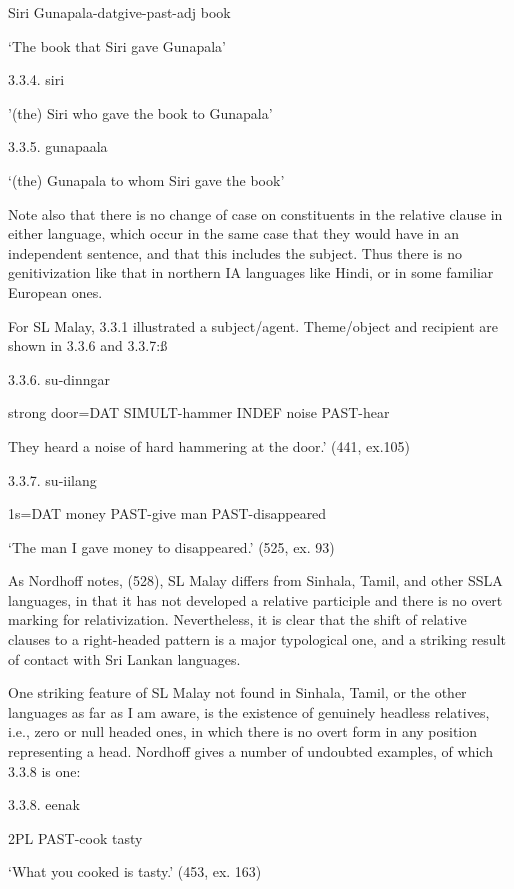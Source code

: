 \documentclass[letterpaper]{article}
\begin{document}
  Siri  Gunapala-datgive-past-adj  book 

   `The book that Siri  gave Gunapala'

3.3.4.
\ea
{}  siri

'(the) Siri who gave the book to Gunapala'

3.3.5. 
\ea
{}  gunapaala

   `(the) Gunapala to whom Siri gave the book'

Note also that there is no change of case on constituents in the relative clause in either language, which occur in the same case that they would have in an independent sentence, and that this includes the subject. Thus there is no genitivization like that in northern IA languages like Hindi, or in some familiar European ones.

For SL Malay, 3.3.1 illustrated a subject/agent. Theme/object and recipient are shown in 3.3.6 and 3.3.7:{\ss}

 3.3.6.
\ea
\gll  [Kirras  pinthu=nang  arà-thatti  hathu svaara] su-dinngar

strong door=DAT SIMULT-hammer INDEF noise PAST-hear

They heard a noise of hard hammering at the door.' (441, ex.105)

 3.3.7.
\ea
{} su-iilang

  1s=DAT money PAST-give  man PAST-disappeared

  `The man I gave money to disappeared.' (525, ex. 93)

As Nordhoff notes, (528), SL Malay differs from Sinhala, Tamil, and other SSLA languages, in that it has not developed a relative participle and there is no overt marking for relativization. Nevertheless, it is clear that the shift of relative clauses to a right-headed pattern is a major typological one, and a striking result of contact with Sri Lankan languages. 

One striking feature of SL Malay not found in Sinhala, Tamil, or the other languages as far as I am aware, is the existence of genuinely headless relatives, i.e., zero or null headed ones, in which there is no overt form in any position representing a head. Nordhoff gives a number of undoubted examples, of which 3.3.8 is one:

 3.3.8.
\ea
{} eenak

  2PL  PAST-cook  tasty

  `What you cooked is tasty.' (453, ex. 163)
\end{document}

